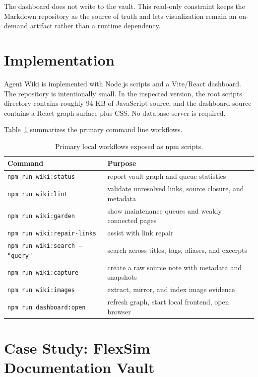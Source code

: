 \documentclass[10pt]{article}
\begin{document}
The dashboard does not write to the vault. This read-only constraint keeps the
Markdown repository as the source of truth and lets visualization remain an
on-demand artifact rather than a runtime dependency.

\section{Implementation}

Agent Wiki is implemented with Node.js scripts and a Vite/React dashboard. The
repository is intentionally small. In the inspected version, the root scripts
directory contains roughly 94 KB of JavaScript source, and the dashboard source
contains a React graph surface plus CSS. No database server is required.

Table~\ref{tab:commands} summarizes the primary command line workflows.

\begin{table}[h]
\centering
\begin{tabular}{ll}
\toprule
Command & Purpose \\
\midrule
\texttt{npm run wiki:status} & report vault graph and queue statistics \\
\texttt{npm run wiki:lint} & validate unresolved links, source closure, and metadata \\
\texttt{npm run wiki:garden} & show maintenance queues and weakly connected pages \\
\texttt{npm run wiki:repair-links} & assist with link repair \\
\texttt{npm run wiki:search -- "query"} & search across titles, tags, aliases, and excerpts \\
\texttt{npm run wiki:capture} & create a raw source note with metadata and snapshots \\
\texttt{npm run wiki:images} & extract, mirror, and index image evidence \\
\texttt{npm run dashboard:open} & refresh graph, start local frontend, open browser \\
\bottomrule
\end{tabular}
\caption{Primary local workflows exposed as npm scripts.}
\label{tab:commands}
\end{table}

\section{Case Study: FlexSim Documentation Vault}
\end{document}
